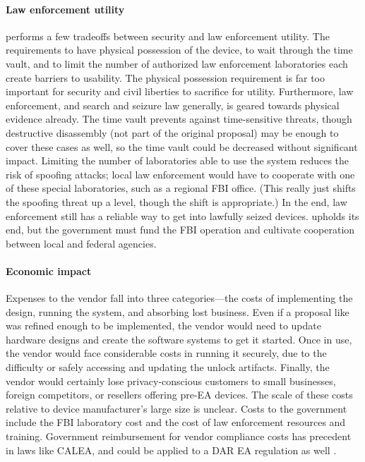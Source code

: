 \paragraph*{Law enforcement utility} \ldawmsr performs a few tradeoffs between security and law enforcement utility. The
requirements to have physical possession of the device, to wait through the time vault, and to limit the number of
authorized law enforcement laboratories each create barriers to usability. The physical possession requirement is far
too important for security and civil liberties to sacrifice for utility. Furthermore, law enforcement, and search and
seizure law generally, is geared towards physical evidence already. The time vault prevents against time-sensitive
threats, though destructive disassembly (not part of the original proposal) may be enough to cover these cases as well,
so the time vault could be decreased without significant impact. Limiting the number of laboratories able to use the
system reduces the risk of spoofing attacks; local law enforcement would have to cooperate with one of these special
laboratories, such as a regional \ac{FBI} office. (This really just shifts the spoofing threat up a level, though the
shift is appropriate.) In the end, law enforcement still has a reliable way to get into lawfully seized devices.
\ldawmsr upholds its end, but the government must fund the \ac{FBI} operation and cultivate cooperation between local
and federal agencies.

\paragraph*{Economic impact} Expenses to the vendor fall into three categories---the costs of implementing the design,
running the system, and absorbing lost business. Even if a proposal like \ldawmsr was refined enough to be implemented,
the vendor would need to update hardware designs and create the software systems to get it started. Once in use, the
vendor would face considerable costs in running it securely, due to the difficulty or safely accessing and updating the
unlock artifacts. Finally, the vendor would certainly lose privacy-conscious customers to small businesses, foreign
competitors, or resellers offering pre-\ac{EA} devices. The scale of these costs relative to device manufacturer's large
size is unclear. Costs to the government include the \ac{FBI} laboratory cost and the cost of law enforcement resources
and training. Government reimbursement for vendor compliance costs has precedent in laws like \acs{CALEA}, and could be
applied to a \ac{DAR} \ac{EA} regulation as well \cite{edwards_hr4922_1994}.
